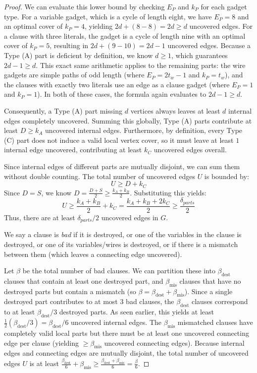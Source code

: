 \begin{proof}
We can evaluate this lower bound by checking $E_P$ and $k_P$ for each gadget type. For a variable gadget, which is a cycle of length eight, we have $E_P = 8$ and an optimal cover of $k_P = 4$, yielding $2d + (8 - 8) = 2d \ge d$ uncovered edges. For a clause with three literals, the gadget is a cycle of length nine with an optimal cover of $k_P = 5$, resulting in $2d + (9 - 10) = 2d - 1$ uncovered edges. Because a Type (A) part is deficient by definition, we know $d \ge 1$, which guarantees $2d - 1 \ge d$. This exact same arithmetic applies to the remaining parts: the wire gadgets are simple paths of odd length (where $E_P = 2t_w - 1$ and $k_P = t_w$), and the clauses with exactly two literals use an edge as a clause gadget (where $E_P = 1$ and $k_P = 1$). In both of these cases, the formula again evaluates to $2d - 1 \ge d$. 

Consequently, a Type (A) part missing $d$ vertices always leaves at least $d$ internal edges completely uncovered. Summing this globally, Type (A) parts contribute at least $D \ge k_A$ uncovered internal edges. Furthermore, by definition, every Type (C) part does not induce a valid local vertex cover, so it must leave at least $1$ internal edge uncovered, contributing at least $k_C$ uncovered edges overall.

Since internal edges of different parts are mutually disjoint, we can sum them without double counting. The total number of uncovered edges $U$ is bounded by:
\[ U \ge D + k_C \]
Since $D = S$, we know $D = \frac{D + S}{2} \ge \frac{k_A + k_B}{2}$. Substituting this yields:
\[ U \ge \frac{k_A + k_B}{2} + k_C = \frac{k_A + k_B + 2k_C}{2} \ge \frac{\delta_{parts}}{2} \]
Thus, there are at least $\delta_{parts}/2$ uncovered edges in $G$.

We say a clause is \emph{bad} if it is destroyed, or one of the variables in the clause is destroyed, or one of its variables/wires is destroyed, or if there is a mismatch between them (which leaves a connecting edge uncovered).

Let $\beta$ be the total number of bad clauses. We can partition these into $\beta_{\text{dest}}$ clauses that contain at least one destroyed part, and $\beta_{\text{mis}}$ clauses that have no destroyed parts but contain a mismatch (so $\beta = \beta_{\text{dest}} + \beta_{\text{mis}}$). Since a single destroyed part contributes to at most 3 bad clauses, the $\beta_{\text{dest}}$ clauses correspond to at least $\beta_{\text{dest}}/3$ destroyed parts. As seen earlier, this yields at least $\frac{1}{2}(\beta_{\text{dest}}/3) = \beta_{\text{dest}}/6$ uncovered internal edges. The $\beta_{\text{mis}}$ mismatched clauses have completely valid local parts but there must be at least one uncovered connecting edge per clause (yielding $\ge \beta_{\text{mis}}$ uncovered connecting edges). Because internal edges and connecting edges are mutually disjoint, the total number of uncovered edges $U$ is at least $\frac{\beta_{\text{dest}}}{6} + \beta_{\text{mis}} \ge \frac{\beta_{\text{dest}} + \beta_{\text{mis}}}{6} = \frac{\beta}{6}$.


\end{proof}
